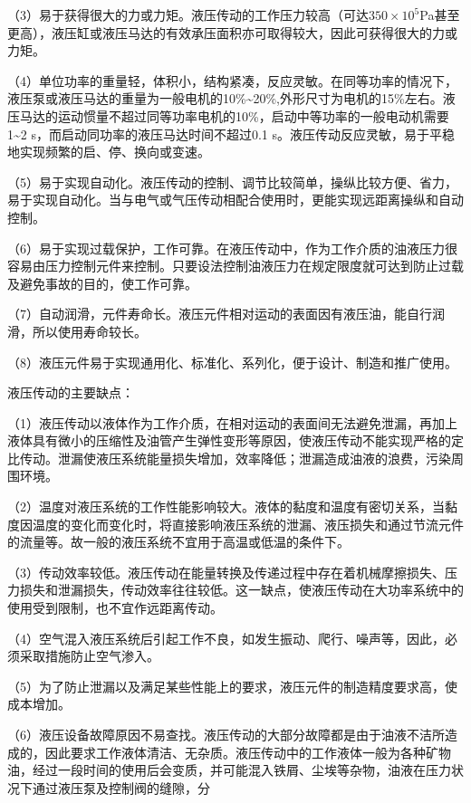     （3）易于获得很大的力或力矩。液压传动的工作压力较高（可达$350\times{10^5}$Pa甚至更高），液压缸或液压马达的有效承压面积亦可取得较大，因此可获得很大的力或力矩。

    （4）单位功率的重量轻，体积小，结构紧凑，反应灵敏。在同等功率的情况下，液压泵或液压马达的重量为一般电机的10\%\textasciitilde20\%,外形尺寸为电机的15\%左右。液压马达的运动惯量不超过同等功率电机的10\%，启动中等功率的一般电动机需要1\textasciitilde2 s，而启动同功率的液压马达时间不超过0.1 s。液压传动反应灵敏，易于平稳地实现频繁的启、停、换向或变速。

    （5）易于实现自动化。液压传动的控制、调节比较简单，操纵比较方便、省力，易于实现自动化。当与电气或气压传动相配合使用时，更能实现远距离操纵和自动控制。

    （6）易于实现过载保护，工作可靠。在液压传动中，作为工作介质的油液压力很容易由压力控制元件来控制。只要设法控制油液压力在规定限度就可达到防止过载及避免事故的目的，使工作可靠。

    （7）自动润滑，元件寿命长。液压元件相对运动的表面因有液压油，能自行润滑，所以使用寿命较长。

    （8）液压元件易于实现通用化、标准化、系列化，便于设计、制造和推广使用。

    液压传动的主要缺点：

    （1）液压传动以液体作为工作介质，在相对运动的表面间无法避免泄漏，再加上液体具有微小的压缩性及油管产生弹性变形等原因，使液压传动不能实现严格的定比传动。泄漏使液压系统能量损失增加，效率降低；泄漏造成油液的浪费，污染周围环境。

    （2）温度对液压系统的工作性能影响较大。液体的黏度和温度有密切关系，当黏度因温度的变化而变化时，将直接影响液压系统的泄漏、液压损失和通过节流元件的流量等。故一般的液压系统不宜用于高温或低温的条件下。

    （3）传动效率较低。液压传动在能量转换及传递过程中存在着机械摩擦损失、压力损失和泄漏损失，传动效率往往较低。这一缺点，使液压传动在大功率系统中的使用受到限制，也不宜作远距离传动。

    （4）空气混入液压系统后引起工作不良，如发生振动、爬行、噪声等，因此，必须采取措施防止空气渗入。

    （5）为了防止泄漏以及满足某些性能上的要求，液压元件的制造精度要求高，使成本增加。
    
    （6）液压设备故障原因不易查找。液压传动的大部分故障都是由于油液不洁所造成的，因此要求工作液体清洁、无杂质。液压传动中的工作液体一般为各种矿物油，经过一段时间的使用后会变质，并可能混入铁屑、尘埃等杂物，油液在压力状况下通过液压泵及控制阀的缝隙，分








